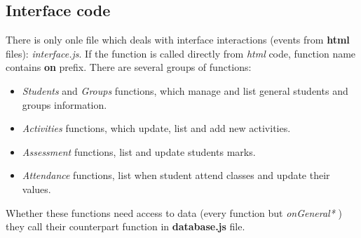 	\subsection{Interface code }
	There is only onle file which deals with interface interactions (events from {\bf html} files): \emph{ interface.js}.
If the function is called directly from \emph{html}	code, function name contains {\bf on} prefix.
There are several groups of functions:
\begin{itemize}
    \item \emph{Students} and \emph{Groups} functions, which manage and list general students and groups information.
    \item \emph{Activities} functions, which update, list and add new activities.
    \item \emph{Assessment} functions, list and update students marks.
    \item \emph{Attendance} functions, list when student attend classes and update their values.
\end{itemize}
Whether these functions need access to data (every function but \emph{ onGeneral* } ) they call  their counterpart 
function in {\bf database.js } file.

